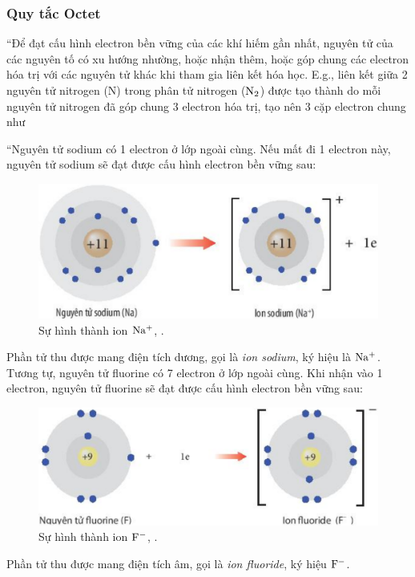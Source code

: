 \documentclass{article}
\numberwithin{equation}{section}
\begin{document}
\subsubsection{Quy tắc Octet}
``Để đạt cấu hình electron bền vững của các khí hiếm gần nhất, nguyên tử của các nguyên tố có xu hướng nhường, hoặc nhận thêm, hoặc góp chung các electron hóa trị với các nguyên tử khác khi tham gia liên kết hóa học. E.g., liên kết giữa 2 nguyên tử nitrogen (N) trong phân tử nitrogen ($\rm N_2$) được tạo thành do mỗi nguyên tử nitrogen đã góp chung 3 electron hóa trị, tạo nên 3 cặp electron chung như \cite[Hình 8.2: \textsf{Sự hình thành liên kết trong phân tử nitrogen}, p. 53]{SGK_Hoa_Hoc_10_Chan_Troi_Sang_Tao}

``Nguyên tử sodium có 1 electron ở lớp ngoài cùng. Nếu mất đi 1 electron này, nguyên tử sodium sẽ đạt được cấu hình electron bền vững sau:

\begin{figure}[h]
	\centering
	\includegraphics[scale=0.15]{su_hinh_thanh_ion_Na}
	\caption{Sự hình thành ion $\rm Na^+$, \cite[Hình 8.3, p. 53]{SGK_Hoa_Hoc_10_Chan_Troi_Sang_Tao}.}
\end{figure}
Phần tử thu được mang điện tích dương, gọi là \textit{ion sodium}, ký hiệu là $\rm Na^+$. Tương tự, nguyên tử fluorine có 7 electron ở lớp ngoài cùng. Khi nhận vào 1 electron, nguyên tử fluorine sẽ đạt được cấu hình electron bền vững sau:

\begin{figure}[h]
	\centering
	\includegraphics[scale=0.15]{su_hinh_thanh_ion_F}
	\caption{Sự hình thành ion $\rm F^-$, \cite[Hình 8.3, p. 54]{SGK_Hoa_Hoc_10_Chan_Troi_Sang_Tao}.}
\end{figure}
Phần tử thu được mang điện tích âm, gọi là \textit{ion fluoride}, ký hiệu $\rm F^-$.
\end{document}
